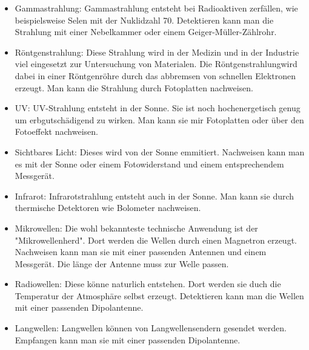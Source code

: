 \begin{itemize}
    \item Gammastrahlung: Gammastrahlung entsteht bei Radioaktiven zerfällen, wie beispielsweise Selen mit der Nuklidzahl 70. Detektieren kann man die Strahlung mit einer Nebelkammer oder einem Geiger-Müller-Zählrohr.
    \item Röntgenstrahlung: Diese Strahlung wird in der Medizin und in der Industrie viel eingesetzt zur Untersuchung von Materialen. Die Röntgenstrahlungwird dabei in einer Röntgenröhre durch das abbremsen von schnellen Elektronen erzeugt. Man kann die Strahlung durch Fotoplatten nachweisen.
    \item UV: UV-Strahlung entsteht in der Sonne. Sie ist noch hochenergetisch genug um erbgutschädigend zu wirken. Man kann sie mir Fotoplatten oder über den Fotoeffekt nachweisen.
    \item Sichtbares Licht: Dieses wird von der Sonne emmitiert. Nachweisen kann man es mit der Sonne oder einem Fotowiderstand und einem entsprechendem Messgerät.
    \item Infrarot: Infrarotstrahlung entsteht auch in der Sonne. Man kann sie durch thermische Detektoren wie Bolometer nachweisen.
    \item Mikrowellen: Die wohl bekannteste technische Anwendung ist der "Mikrowellenherd". Dort werden die Wellen durch einen Magnetron erzeugt. Nachweisen kann man sie mit einer passenden Antennen und einem Messgerät. Die länge der Antenne muss zur Welle passen.
    \item Radiowellen: Diese könne naturlich entstehen. Dort werden sie duch die Temperatur der Atmosphäre selbst erzeugt. Detektieren kann man die Wellen mit einer passenden Dipolantenne.
    \item Langwellen: Langwellen können von Langwellensendern gesendet werden. Empfangen kann man sie mit einer passenden Dipolantenne.
\end{itemize}
